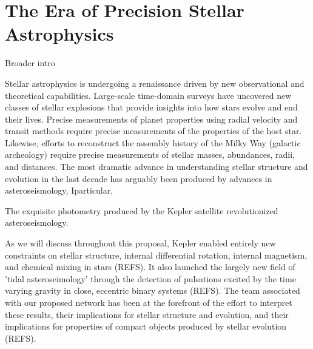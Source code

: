 \section{The Era of Precision Stellar Astrophysics}
Broader intro

Stellar astrophysics is undergoing a renaissance driven by new observational and theoretical capabilities. Large-scale time-domain surveys have uncovered new classes of stellar explosions that provide insights into how stars evolve and end their lives.  Precise measurements of planet properties using radial velocity and transit methods require precise measurements of the properties of the host star.  Likewise, efforts to reconstruct the assembly history of the Milky Way (galactic archeology) require precise measurements of stellar masses, abundances, radii, and distances.    The most dramatic advance in understanding stellar structure and evolution in the last decade has arguably been produced by advances in asteroseismology, Iparticular, 

The exquisite photometry produced by the Kepler satellite revolutionized asteroseismology.  

As we will discuss throughout this proposal, Kepler enabled entirely new constraints on stellar structure, internal differential rotation, internal magnetism, and chemical mixing in stars (REFS).  It also launched the largely new field of 'tidal asteroseimology' through the detection of pulsations excited by the time varying gravity in close, eccentric binary systems (REFS). The team associated with our proposed network has been at the forefront of the effort to interpret these results, their implications for stellar structure and evolution, and their implications for properties of compact objects produced by stellar evolution (REFS).   

